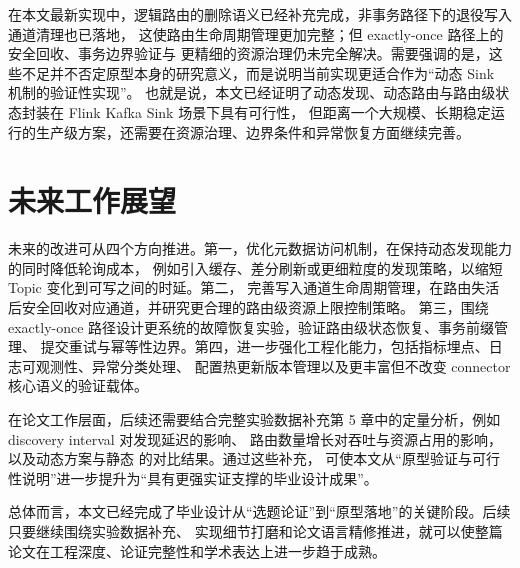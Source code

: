 在本文最新实现中，逻辑路由的删除语义已经补充完成，非事务路径下的退役写入通道清理也已落地，
这使路由生命周期管理更加完整；但 exactly-once 路径上的安全回收、事务边界验证与
更精细的资源治理仍未完全解决。需要强调的是，这些不足并不否定原型本身的研究意义，而是说明当前实现更适合作为“动态 Sink 机制的验证性实现”。
也就是说，本文已经证明了动态发现、动态路由与路由级状态封装在 Flink Kafka Sink 场景下具有可行性，
但距离一个大规模、长期稳定运行的生产级方案，还需要在资源治理、边界条件和异常恢复方面继续完善。

\section{未来工作展望}

未来的改进可从四个方向推进。第一，优化元数据访问机制，在保持动态发现能力的同时降低轮询成本，
例如引入缓存、差分刷新或更细粒度的发现策略，以缩短 Topic 变化到可写之间的时延。第二，
完善写入通道生命周期管理，在路由失活后安全回收对应通道，并研究更合理的路由级资源上限控制策略。
第三，围绕 exactly-once 路径设计更系统的故障恢复实验，验证路由级状态恢复、事务前缀管理、
提交重试与幂等性边界。第四，进一步强化工程化能力，包括指标埋点、日志可观测性、异常分类处理、
配置热更新版本管理以及更丰富但不改变 connector 核心语义的验证载体。

在论文工作层面，后续还需要结合完整实验数据补充第 5 章中的定量分析，例如 discovery interval 对发现延迟的影响、
路由数量增长对吞吐与资源占用的影响，以及动态方案与静态  的对比结果。通过这些补充，
可使本文从“原型验证与可行性说明”进一步提升为“具有更强实证支撑的毕业设计成果”。

总体而言，本文已经完成了毕业设计从“选题论证”到“原型落地”的关键阶段。后续只要继续围绕实验数据补充、
实现细节打磨和论文语言精修推进，就可以使整篇论文在工程深度、论证完整性和学术表达上进一步趋于成熟。
